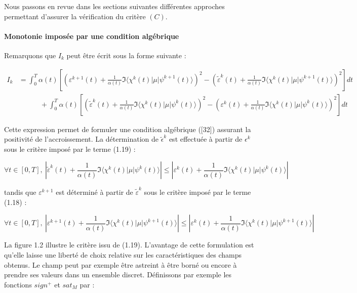 Nous passons en revue dans les sections suivantes différentes approches permettant d’assurer la vérification du critère $(C)$.

\paragraph*{Monotonie imposée par une condition algébrique}
$ $\\
Remarquons que $I_k$ peut être écrit sous la forme suivante :

\begin{align}
I_k & = \int_0^T \alpha(t)\left[ \left(\varepsilon^{k+1}(t) + \frac{1}{\alpha(t)} \Im\langle \chi^k(t)|\mu|\psi^{k+1}(t)\rangle \right)^2 - \left(\tilde{\varepsilon}^k(t) + \frac{1}{\alpha(t)} \Im\langle \chi^k(t)|\mu|\psi^{k+1}(t)\rangle \right)^2 \right] dt \\
& \quad \quad \quad + \int_0^T \alpha(t)\left[ \left(\tilde{\varepsilon}^k(t) + \frac{1}{\alpha(t)} \Im\langle \chi^k(t)|\mu|\psi^k(t)\rangle \right)^2 - \left(\varepsilon^k(t) + \frac{1}{\alpha(t)} \Im\langle \chi^k(t)|\mu|\psi^k(t)\rangle
 \right)^2 \right] dt
\end{align}

Cette expression permet de formuler une condition algébrique ([32]) assurant la positivité de l'accroissement. La détermination de $\tilde{\epsilon}^k$ est effectuée à partir de $ \epsilon^k$ sous le critère imposé par le terme (1.19) :

$$\forall t \in [0,T],\ \left|\tilde{\varepsilon}^k(t) + \frac{1}{\alpha(t)} \Im\langle \chi^k(t)|\mu|\psi^k(t)\rangle\right|\leq \left|\varepsilon^k(t) + \frac{1}{\alpha(t)} \Im\langle \chi^k(t)|\mu|\psi^k(t)\rangle\right| $$

tandis que $\varepsilon^{k+1}$ est déterminé à partir de $\tilde{\varepsilon}^k$ sous le critère imposé par le terme (1.18) :

$$\forall t \in [0,T],\ \left|\varepsilon^{k+1}(t) + \frac{1}{\alpha(t)} \Im\langle \chi^k(t)|\mu|\psi^{k+1}(t)\rangle\right|\leq \left|\varepsilon^k(t) + \frac{1}{\alpha(t)} \Im\langle \chi^k(t)|\mu|\psi^{k+1}(t)\rangle\right| $$

La figure 1.2 illustre le critère issu de (1.19). L'avantage de cette formulation est qu'elle laisse une liberté de choix relative sur les caractéristiques des champs obtenus. Le champ peut par exemple être astreint à être borné ou encore à prendre ses valeurs dans un ensemble discret. Définissons par exemple les fonctions $sign^+$ et $sat_M$ par :

